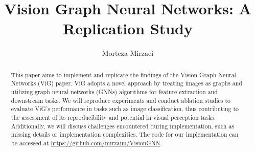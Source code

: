 \documentclass[sigconf, nonacm]{acmart}
\newcommand\vldbdoi{XX.XX/XXX.XX}
\newcommand\vldbpages{XXX-XXX}
\newcommand\vldbvolume{14}
\newcommand\vldbissue{1}
\newcommand\vldbyear{2020}
\newcommand\vldbauthors{\authors}
\newcommand\vldbtitle{\shorttitle}
\newcommand\vldbpagestyle{plain}
\begin{document}
\title{Vision Graph Neural Networks: A Replication Study}

\author{Morteza Mirzaei}

\begin{abstract}
  This paper aims to implement and replicate the findings of the Vision Graph Neural Networks (ViG) paper. ViG adopts a novel approach by treating images as graphs and utilizing graph neural networks (GNNs) algorithms for feature extraction and downstream tasks. We will reproduce experiments and conduct ablation studies to evaluate ViG's performance in tasks such as image classification, thus contributing to the assessment of its reproducibility and potential in visual perception tasks. Additionally, we will discuss challenges encountered during implementation, such as missing details or implementation complexities. The code for our implementation can be accessed at \url{https://github.com/mirzaim/VisionGNN}.
\end{abstract}

\maketitle

\end{document}
